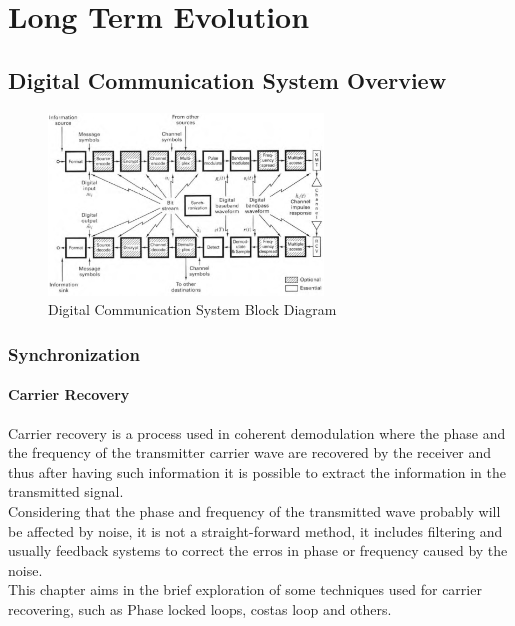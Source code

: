 \chapter{Long Term Evolution}
\label{chap:lte}

\section{Digital Communication System Overview}
\label{lte:digicomm}

\begin{figure}[htbp]
    \centering
    \includegraphics[width=0.65\textwidth]{./figures/digicomm_block}
    \caption{ Digital Communication System Block Diagram
    \label{fig:digcomm}}
\end{figure}

\subsection{Synchronization}

\subsubsection{Carrier Recovery}

Carrier recovery is a process used in coherent demodulation where the phase
and the frequency of the transmitter carrier wave are recovered by the receiver
and thus after having such information it is possible to extract the information
in the transmitted signal.\\
Considering that the phase and frequency of the transmitted wave probably will
be affected by noise, it is not a straight-forward method, it includes filtering
and usually feedback systems to correct the erros in phase or frequency caused
by the noise.\\
This chapter aims in the brief exploration of some techniques used for carrier
recovering, such as Phase locked loops, costas loop and others.\\


